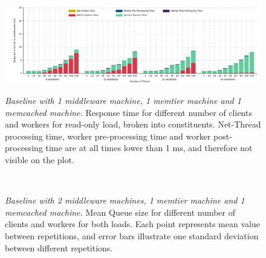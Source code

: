 \documentclass[11pt,a4paper]{article}
\begin{document}
\begin{figure}[ht!]
	\centering	
	\includegraphics[width=1\linewidth]{../plots/baseline_2midd/timers/ALL_TIMES_TOGETHER_READ-ONLY.pdf}
	\label{Figure:baseline_2midd_all:a}\\
	\caption{\textit{Baseline with 1 middleware machine, 1 memtier machine and 1 memcached machine.} Response time for different number of clients and workers for read-only load, broken into constituents. Net-Thread processing time, worker pre-processing time and worker post-processing time are at all times lower than 1 ms, and therefore not visible on the plot.}
	\label{Figure:baseline_2midd_all}	
\end{figure}

\begin{figure}[ht!]
	\centering	
	\hfill
	\\
	\caption{\textit{Baseline with 2 middleware machines, 1 memtier machine and 1 memcached machine.} Mean Queue size for different number of clients and workers for both loads.  Each point represents mean value between repetitions, and error bars illustrate one standard deviation between different repetitions.}
	\label{Figure:baseline_2midd_queue}	
\end{figure}
\end{document}
